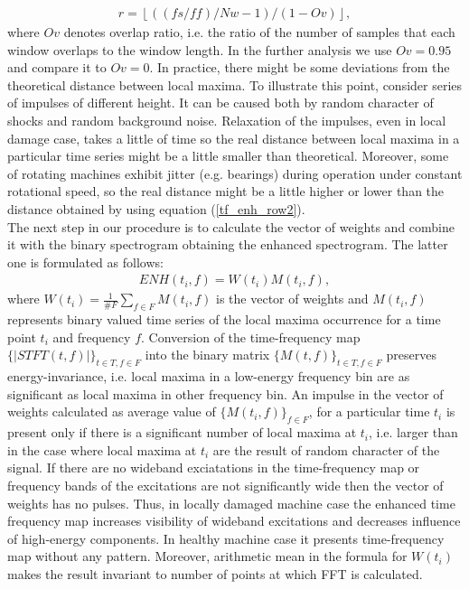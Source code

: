 \begin{eqnarray}\label{tf_enh_row2}
r=\left\lfloor ((fs/ff)/Nw-1)/(1-Ov)\right\rfloor,
\end{eqnarray}
where $Ov$ denotes overlap ratio, i.e. the ratio of the number of samples that each window overlaps to the window length. In the further analysis we use $Ov=0.95$ and compare it to $Ov=0$. In practice, there might be some deviations from the theoretical distance between local maxima. To illustrate this point, consider series of impulses of different height. It can be caused both by random character of shocks and random background noise. Relaxation of the impulses, even in local damage case, takes a little of time so the real distance between local maxima in a particular time series might be a little smaller than theoretical. Moreover, some of rotating machines exhibit jitter (e.g. bearings) during operation under constant rotational speed, so the real distance might be a little higher or lower than the distance obtained by using equation (\ref{tf_enh_row2}).\\
The next step in our procedure is to calculate the vector of weights and combine it with the binary spectrogram obtaining the enhanced spectrogram. The latter one is formulated as follows:
\begin{eqnarray}\label{tf_enh_row3}
ENH(t_i,f)=W(t_i)M(t_i,f),
\end{eqnarray}
where $W(t_i)=\frac{1}{\#F}\sum_{f\in F}M(t_i,f)$ is the vector of weights and $M(t_i,f)$  represents binary valued time series of the local maxima occurrence
for a time point  $t_i$ and frequency $f$. Conversion of the time-frequency map $\{|STFT(t,f)|\}_{t\in T, f\in F}$ into the binary matrix $\{M(t,f)\}_{t\in T, f\in F}$ preserves energy-invariance, i.e. local maxima in a low-energy frequency bin are as significant as local maxima in other frequency bin. An impulse in the vector of weights calculated as average value of $\{M(t_i,f)\}_{f\in F}$, for a particular time $t_i$ is present only if there is a significant number of local maxima at $t_i$, i.e. larger than in the case where local maxima at $t_i$ are the result of random character of the signal. If there are no wideband exciatations in the time-frequency map or frequency bands of the excitations are not significantly wide then the vector of weights has no pulses. Thus, in locally damaged machine case the enhanced time frequency map increases visibility of wideband excitations and decreases influence of high-energy components. In healthy machine case it presents time-frequency map without any pattern. Moreover, arithmetic mean in the formula for $W(t_i)$ makes the result invariant to number of points at which FFT is calculated.\\
